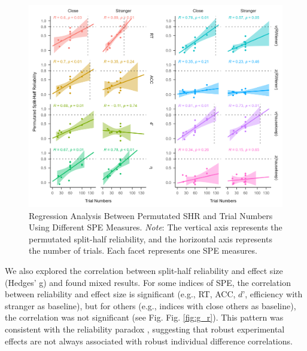 \documentclass[sn-apa]{sn-jnl}%
\theoremstyle{thmstyleone}%
\theoremstyle{thmstyletwo}%
\theoremstyle{thmstylethree}%
\begin{document}
\begin{figure}[!h]
	\centering
	\includegraphics[width=1\textwidth]{./Figure/Fig7_r&Trial.png}
	\caption[Regression Analysis Between Permutated and Trial Numbers Using Different SPE Measures.]{Regression Analysis Between Permutated SHR and Trial Numbers Using Different SPE Measures.  \textit{Note}: The vertical axis represents the permutated split-half reliability, and the horizontal axis represents the number of trials. Each facet represents one SPE measures.
	}\label{fig:R_nTrial}
\end{figure}
\clearpage

We also explored the correlation between split-half reliability and effect size (Hedges’ g) and found mixed results. For some indices of SPE, the correlation between reliability and effect size is significant (e.g., RT, ACC, $d’$, efficiency with stranger as baseline), but for others (e.g., indices with close others as baseline), the correlation was not significant (see Fig. Fig. \ref{fig:g_r}). This pattern was consistent with the reliability paradox \parencite{hedge2018reliability,logie1996group}, suggesting that robust experimental effects are not always associated with robust individual difference correlations.
\end{document}
